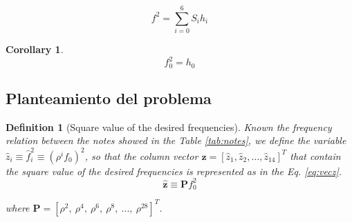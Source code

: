 \documentclass{article}
\newtheorem{mydef}{Definition}[section]
\newtheorem{corollary}{Corollary}[section]
\begin{document}
\begin{equation} \label{EcD}
 f^{2} = \sum_{i=0}^{6}{S_i h_i}
\end{equation}

\begin{corollary}

\begin{equation} 
 f_0^{2} = h_0
\end{equation}
 
\end{corollary}



\subsection{Planteamiento del problema}


\begin{mydef}[Square value of the desired frequencies]
Known the frequency relation between the notes showed in the Table \ref{tab:notes}, 
we define the variable $\hat{z}_i\equiv \hat{f}_i^2 \equiv \left( {\rho}^{i} f_0 \right)^{2} $,
so that the  column vector $\mathbf{\hat{z}}= \left[ \hat{z}_1, \hat{z}_2, \hdots, \hat{z}_{14}\right]^{T} $ 
that contain the square value of the desired frequencies
is represented as in the Eq. \ref{eq:vecz}.
\begin{equation} \label{eq:vecz}
\mathbf{\hat{z}}
\equiv \mathbf{P} f_{0}^2
\end{equation}

where $\mathbf{P}=[\rho^2,~\rho^4,~\rho^6,~\rho^8,~...,~\rho^{28}]^T$.

\end{mydef}
\end{document}
